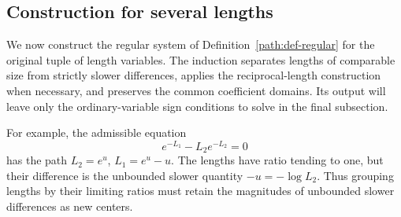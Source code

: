 \subsection{Construction for several lengths}

We now construct the regular system of
Definition~\ref{path:def-regular} for the original tuple of length
variables. The induction separates lengths of comparable size from
strictly slower differences, applies the reciprocal-length construction
when necessary, and preserves the common coefficient domains. Its
output will leave only the ordinary-variable sign conditions to solve
in the final subsection.

For example, the admissible equation
\[
 e^{-L_1}-L_2e^{-L_2}=0
\]
has the path \(L_2=e^u\), \(L_1=e^u-u\).
The lengths have ratio tending to one, but their difference is the
unbounded slower quantity \(-u=-\log L_2\). Thus grouping lengths by
their limiting ratios must retain the magnitudes of unbounded slower
differences as new centers.

